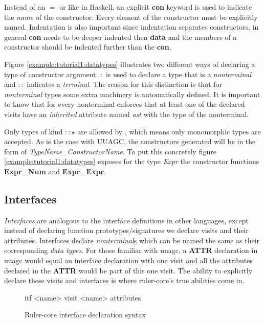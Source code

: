 Instead of an $=$ or \textbar \space like in Haskell, an explicit \textbf{con} keyword is used to indicate the \emph{name} of the constructor. Every element of the constructor must be explicitly named. Indentation is also important since indentation separates constructors, in general \textbf{con} needs to be deeper indented then \textbf{data} and the members of a constructor should be indented further than the \textbf{con}. 

Figure \ref{example:tutorial1:datatypes} illustrates two different ways of declaring a type of constructor argument. $:$ is used to declare a type that is a \emph{nonterminal} and $::$ indicates a \emph{terminal}. The reason for this distinction is that for \emph{nonterminal} types some extra machinery is automatically defined. It is important to know that for every nonterminal \rcore enforces that at least one of the declared visits have an \emph{inherited} attribute named \emph{ast} with the type of the nonterminal.

Only types of kind $:: \star$ are allowed by \rcore, which means only monomorphic types are accepted. As is the case with UUAGC, the constructors generated will be in the form of \emph{TypeName\_ConstructorName}. To put this concretely figure \ref{example:tutorial1:datatypes} exposes for the type \emph{Expr} the constructor functions \textbf{Expr\_Num} and \textbf{Expr\_Expr}.

\subsection{Interfaces}
\emph{Interfaces} are analogous to the interface definitions in other languages, except instead of declaring function prototypes/signatures we declare visits and their attributes. Interfaces declare \emph{nonterminal}s which can be named the same as their corresponding \emph{data types}. For those familiar with uuagc, a \textbf{ATTR} declaration in uuagc would equal an interface declaration with one visit and all the attributes declared in the \textbf{ATTR} would be part of this one visit. The ability to explicitly declare these visits and interfaces is where ruler-core's true abilities come in.

\begin{figure}[h!]
\begin{code}
itf <name>
  {visit <name>
    {attributes}
  }
\end{code}
\caption{Ruler-core interface declaration syntax}
\label{itf:syntax}
\end{figure}

